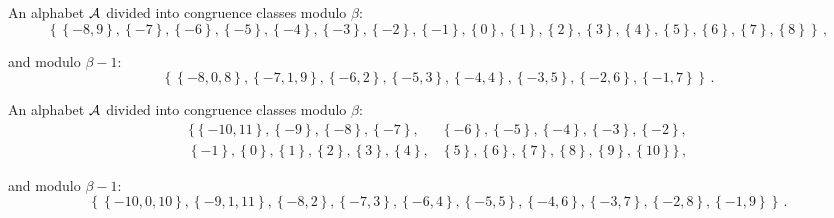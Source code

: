 \begin{exmp}
\label{ex:integerAQ}

An alphabet $\mathcal{A}$ divided into congruence classes modulo $\beta$: 
$$ \left\{\left\{-8, 9\right\}, \left\{-7\right\}, \left\{-6\right\}, \left\{-5\right\}, \left\{-4\right\}, \left\{-3\right\}, \left\{-2\right\}, \left\{-1\right\}, \left\{0\right\}, \left\{1\right\}, \left\{2\right\}, \left\{3\right\}, \left\{4\right\}, \left\{5\right\}, \left\{6\right\}, \left\{7\right\}, \left\{8\right\}\right\} \,,$$

and modulo $\beta - 1$: $$ \left\{\left\{-8, 0, 8\right\}, \left\{-7, 1, 9\right\}, \left\{-6, 2\right\}, \left\{-5, 3\right\}, \left\{-4, 4\right\}, \left\{-3, 5\right\}, \left\{-2, 6\right\}, \left\{-1, 7\right\}\right\} \,.$$

\end{exmp}


\begin{exmp}
\label{ex:integerAR}

An alphabet $\mathcal{A}$ divided into congruence classes modulo $\beta$: 
\begin{align*}
\{\left\{-10, 11\right\}, \left\{-9\right\}, \left\{-8\right\}, \left\{-7\right\},& \left\{-6\right\}, \left\{-5\right\}, \left\{-4\right\}, \left\{-3\right\}, \left\{-2\right\},  \\
\left\{-1\right\}, \left\{0\right\}, \left\{1\right\}, \left\{2\right\}, \left\{3\right\}, \left\{4\right\},& \left\{5\right\}, \left\{6\right\}, \left\{7\right\}, \left\{8\right\}, \left\{9\right\}, \left\{10\right\}\} \,,
\end{align*}

and modulo $\beta - 1$: $$ \left\{\left\{-10, 0, 10\right\}, \left\{-9, 1, 11\right\}, \left\{-8, 2\right\}, \left\{-7, 3\right\}, \left\{-6, 4\right\}, \left\{-5, 5\right\}, \left\{-4, 6\right\}, \left\{-3, 7\right\}, \left\{-2, 8\right\}, \left\{-1, 9\right\}\right\} \,.$$

\end{exmp}


